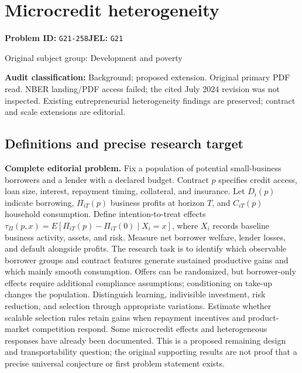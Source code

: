 \documentclass[11pt,a4paper]{article}
\begin{document}
\section*{Microcredit heterogeneity}
\textbf{Problem ID:} \texttt{G21-258}\quad \textbf{JEL:} \texttt{G21}\par
\label{problem:OP-0373}
\label{audited:ECON-085}
{\sffamily\small\color{muted}Original subject group: Development and poverty\par}
\label{definitions:problem:30007655}
\textbf{Audit classification:} Background; proposed extension. Original primary PDF read. NBER landing/PDF access failed; the cited July 2024 revision was not inspected. Existing entrepreneurial heterogeneity findings are preserved; contract and scale extensions are editorial.
\subsection*{Definitions and precise research target}
\textbf{Complete editorial problem.} Fix a population of potential small-business borrowers and a lender with a declared budget. Contract \(p\) specifies credit access, loan size, interest, repayment timing, collateral, and insurance. Let \(D_i(p)\) indicate borrowing, \(\Pi_{iT}(p)\) business profits at horizon \(T\), and \(C_{iT}(p)\) household consumption. Define intention-to-treat effects \(\tau_\Pi(p,x)=E[\Pi_{iT}(p)-\Pi_{iT}(0)\mid X_i=x]\), where \(X_i\) records baseline business activity, assets, and risk. Measure net borrower welfare, lender losses, and default alongside profits. The research task is to identify which observable borrower groups and contract features generate sustained productive gains and which mainly smooth consumption. Offers can be randomized, but borrower-only effects require additional compliance assumptions; conditioning on take-up changes the population. Distinguish learning, indivisible investment, risk reduction, and selection through appropriate variations. Estimate whether scalable selection rules retain gains when repayment incentives and product-market competition respond. Some microcredit effects and heterogeneous responses have already been documented. This is a proposed remaining design and transportability question; the original supporting results are not proof that a precise universal conjecture or first problem statement exists.
\end{document}

